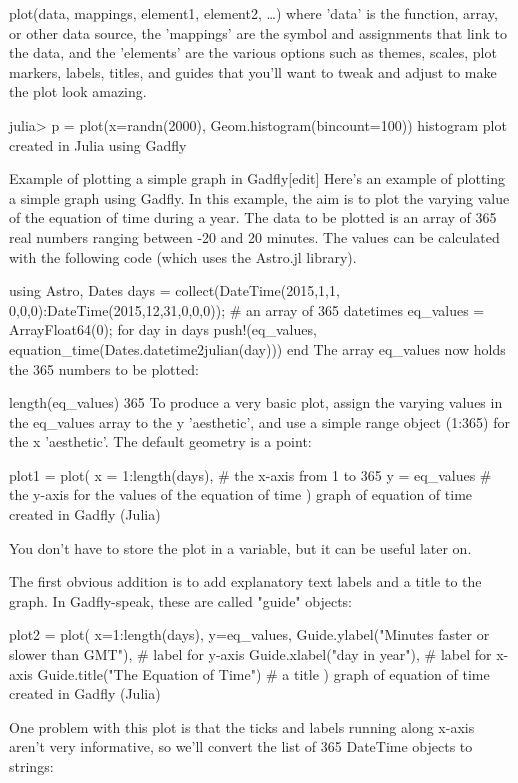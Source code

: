 plot(data, mappings, element1, element2, …)
where 'data' is the function, array, or other data source, the 'mappings' are the symbol and assignments that link to the data, and the 'elements' are the various options such as themes, scales, plot markers, labels, titles, and guides that you'll want to tweak and adjust to make the plot look amazing.

julia> p = plot(x=randn(2000), Geom.histogram(bincount=100))
histogram plot created in Julia using Gadfly

Example of plotting a simple graph in Gadfly[edit]
Here's an example of plotting a simple graph using Gadfly. In this example, the aim is to plot the varying value of the equation of time during a year. The data to be plotted is an array of 365 real numbers ranging between -20 and 20 minutes. The values can be calculated with the following code (which uses the Astro.jl library).

using Astro, Dates 
days = collect(DateTime(2015,1,1, 0,0,0):DateTime(2015,12,31,0,0,0)); # an array of 365 datetimes
eq_values = Array{Float64}(0);
for day in days
   push!(eq_values, equation_time(Dates.datetime2julian(day)))
end
The array eq_values now holds the 365 numbers to be plotted:

length(eq_values)
365
To produce a very basic plot, assign the varying values in the eq_values array to the y 'aesthetic', and use a simple range object (1:365) for the x 'aesthetic'. The default geometry is a point:

plot1 = plot(
   x = 1:length(days), # the x-axis from 1 to 365
   y = eq_values       # the y-axis for the values of the equation of time   
   )
graph of equation of time created in Gadfly (Julia)

You don't have to store the plot in a variable, but it can be useful later on.

The first obvious addition is to add explanatory text labels and a title to the graph. In Gadfly-speak, these are called "guide" objects:

plot2 = plot(
   x=1:length(days),
   y=eq_values,
   Guide.ylabel("Minutes faster or slower than GMT"), # label for y-axis
   Guide.xlabel("day in year"),  # label for x-axis
   Guide.title("The Equation of Time")  # a title
)
graph of equation of time created in Gadfly (Julia)

One problem with this plot is that the ticks and labels running along x-axis aren't very informative, so we'll convert the list of 365 DateTime objects to strings:

